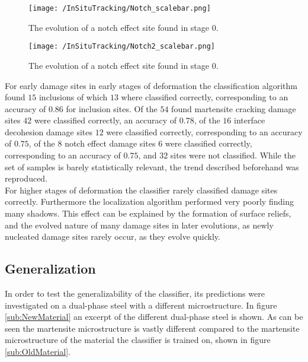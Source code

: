 \begin{figure}
\texttt{[image: /InSituTracking/Notch\_scalebar.png]}
\caption{The evolution of a notch effect site found in stage 0.}
\label{fig:NEEV1}
\end{figure}

\begin{figure}
\texttt{[image: /InSituTracking/Notch2\_scalebar.png]}
\caption{The evolution of a notch effect site found in stage 0.}
\label{fig:NEEV2}
\end{figure}



For early damage sites in early stages of deformation the classification algorithm found $15$ inclusions of which $13$ where classified correctly, corresponding to an accuracy of $0.86$ for inclusion sites. Of the $54$ found martensite cracking damage sites $42$ were classified correctly, an accuracy of $0.78$, of the $16$ interface decohesion damage sites $12$ were classified correctly, corresponding to an accuracy of $0.75$, of the $8$ notch effect damage sites $6$ were classified correctly, corresponding to an accuracy of $0.75$, and $32$ sites were not classified. While the set of samples is barely statistically relevant, the trend described beforehand was reproduced. \\

For higher stages of deformation the classifier rarely classified damage sites correctly. Furthermore the localization algorithm performed very poorly finding many shadows. This effect can be explained by the formation of surface reliefs, and the evolved nature of many damage sites in later evolutions, as newly nucleated damage sites rarely occur, as they evolve quickly. 

\subsection{Generalization}

In order to test the generalizability of the classifier, its predictions were investigated on a dual-phase steel with a different microstructure. In figure \ref{sub:NewMaterial} an excerpt of the different dual-phase steel is shown. As can be seen the martensite microstructure is vastly different compared to the martensite microstructure of the material the classifier is trained on, shown in figure \ref{sub:OldMaterial}. \\

%
%

